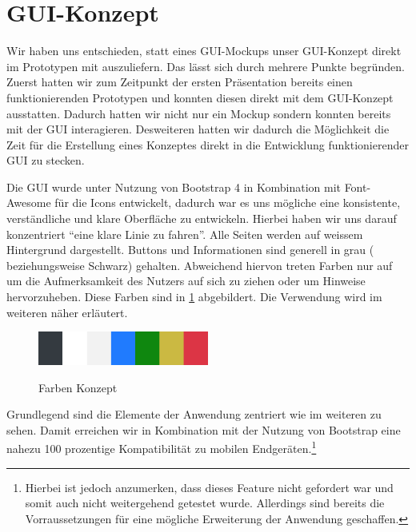 
\section{GUI-Konzept}

Wir haben uns entschieden, statt eines GUI-Mockups unser GUI-Konzept direkt im Prototypen mit auszuliefern.
Das lässt sich durch mehrere Punkte begründen.
Zuerst hatten wir zum Zeitpunkt der ersten Präsentation bereits einen funktionierenden Prototypen und konnten diesen direkt mit dem GUI-Konzept ausstatten. Dadurch hatten wir nicht nur ein Mockup sondern konnten bereits mit der GUI interagieren.
Desweiteren hatten wir dadurch die Möglichkeit die Zeit für die Erstellung eines Konzeptes direkt in die Entwicklung funktionierender GUI zu stecken.

Die GUI wurde unter Nutzung von Bootstrap 4 in Kombination mit Font-Awesome für die Icons entwickelt, dadurch war es uns mögliche eine konsistente, verständliche und klare Oberfläche zu entwickeln.
Hierbei haben wir uns darauf konzentriert \enquote{eine klare Linie zu fahren}. Alle Seiten werden auf weissem Hintergrund dargestellt. Buttons und Informationen sind generell in grau ( beziehungsweise Schwarz) gehalten. 
Abweichend hiervon treten Farben nur auf um die Aufmerksamkeit des Nutzers auf sich zu ziehen oder um Hinweise hervorzuheben. Diese Farben sind in \cref{fig:farbmuster} abgebildert. Die Verwendung wird im weiteren näher erläutert.

\begin{figure}[hbt]
\centering
\begin{minipage}[t]{1\textwidth}
    \caption{Farben Konzept}
    \includegraphics[width=0.5\textwidth]{img/farbmuster.png}\\
    \label{fig:farbmuster}
\end{minipage}
\end{figure}


Grundlegend sind die Elemente der Anwendung zentriert wie im weiteren zu sehen. Damit erreichen wir in Kombination mit der Nutzung von Bootstrap eine nahezu 100 prozentige Kompatibilität zu mobilen Endgeräten.\footnote{Hierbei ist jedoch anzumerken, dass dieses Feature nicht gefordert war und somit auch nicht weitergehend getestet wurde. Allerdings sind bereits die Vorraussetzungen für eine mögliche Erweiterung der Anwendung geschaffen.}

